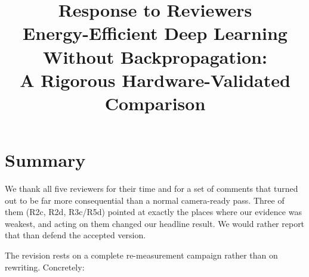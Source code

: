 \documentclass[11pt,a4paper]{article}
\title{\vspace{-1.5cm}Response to Reviewers\\[2pt]
  \large Energy-Efficient Deep Learning Without Backpropagation:\\
  A Rigorous Hardware-Validated Comparison}
\author{}
\date{}
\begin{document}
\maketitle
\vspace{-1.2cm}

\section*{Summary}

We thank all five reviewers for their time and for a set of comments that
turned out to be far more consequential than a normal camera-ready pass. Three
of them (R2c, R2d, R3c/R5d) pointed at exactly the places where our evidence
was weakest, and acting on them changed our headline result. We would rather
report that than defend the accepted version.

The revision rests on a complete re-measurement campaign rather than on
rewriting. Concretely:
\end{document}
